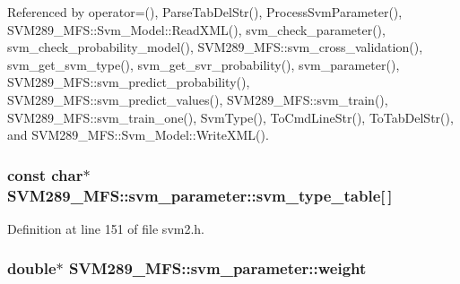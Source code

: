 Referenced by operator=(), Parse\+Tab\+Del\+Str(), Process\+Svm\+Parameter(), S\+V\+M289\+\_\+\+M\+F\+S\+::\+Svm\+\_\+\+Model\+::\+Read\+X\+M\+L(), svm\+\_\+check\+\_\+parameter(), svm\+\_\+check\+\_\+probability\+\_\+model(), S\+V\+M289\+\_\+\+M\+F\+S\+::svm\+\_\+cross\+\_\+validation(), svm\+\_\+get\+\_\+svm\+\_\+type(), svm\+\_\+get\+\_\+svr\+\_\+probability(), svm\+\_\+parameter(), S\+V\+M289\+\_\+\+M\+F\+S\+::svm\+\_\+predict\+\_\+probability(), S\+V\+M289\+\_\+\+M\+F\+S\+::svm\+\_\+predict\+\_\+values(), S\+V\+M289\+\_\+\+M\+F\+S\+::svm\+\_\+train(), S\+V\+M289\+\_\+\+M\+F\+S\+::svm\+\_\+train\+\_\+one(), Svm\+Type(), To\+Cmd\+Line\+Str(), To\+Tab\+Del\+Str(), and S\+V\+M289\+\_\+\+M\+F\+S\+::\+Svm\+\_\+\+Model\+::\+Write\+X\+M\+L().

\subsubsection[{\texorpdfstring{svm\+\_\+type\+\_\+table}{svm_type_table}}]{\setlength{\rightskip}{0pt plus 5cm}const char$\ast$ S\+V\+M289\+\_\+\+M\+F\+S\+::svm\+\_\+parameter\+::svm\+\_\+type\+\_\+table\mbox{[}$\,$\mbox{]}\hspace{0.3cm}{\ttfamily [static]}}\hypertarget{struct_s_v_m289___m_f_s_1_1svm__parameter_ac02b23262dbe2100ab6e9a2922602ec5}{}\label{struct_s_v_m289___m_f_s_1_1svm__parameter_ac02b23262dbe2100ab6e9a2922602ec5}


Definition at line 151 of file svm2.\+h.

\subsubsection[{\texorpdfstring{weight}{weight}}]{\setlength{\rightskip}{0pt plus 5cm}double$\ast$ S\+V\+M289\+\_\+\+M\+F\+S\+::svm\+\_\+parameter\+::weight}\hypertarget{struct_s_v_m289___m_f_s_1_1svm__parameter_a6d64cad82215930bd3f55b3c3ef7c543}{}\label{struct_s_v_m289___m_f_s_1_1svm__parameter_a6d64cad82215930bd3f55b3c3ef7c543}


